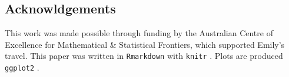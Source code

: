 \hypertarget{acknowldgements}{%
\subsection{Acknowldgements}\label{acknowldgements}}

This work was made possible through funding by the Australian Centre of
Excellence for Mathematical \& Statistical Frontiers, which supported
Emily's travel. This paper was written in \texttt{Rmarkdown}
\citep{rmarkdown_pkg, rmarkdown, rmarkdown_cookbook} with \texttt{knitr}
\citep{knitr_pkg, knitr}. Plots are produced \texttt{ggplot2}
\citep{ggplot2}.

\clearpage




\address{%
Weihao Li\\
Monash University\\%
Econometrics and Business Statistics\\
%
%
%
\\\href{mailto:weihao.li@monash.edu}{\nolinkurl{weihao.li@monash.edu}}
}

\address{%
Emily Dodwell\\
??\\%
line 1\\ line 2\\
%
%
%
\\\href{mailto:emdodwell@gmail.com}{\nolinkurl{emdodwell@gmail.com}}
}

\address{%
Dianne Cook\\
Monash University\\%
Econometrics and Business Statistics\\
%
%
%
\\\href{mailto:dicook@monash.edu}{\nolinkurl{dicook@monash.edu}}
}
